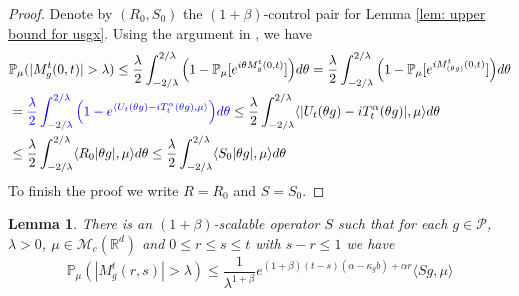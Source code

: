 \documentclass[12pt,oneside,english]{amsart}
\theoremstyle{plain}
\newtheorem{lem}[thm]{Lemma}
\theoremstyle{definition}
\numberwithin{equation}{section}
\newcommand{\added}[1]{{\color{blue}#1}}\newcommand{\deleted}[1]{{\color{red}#1}}
\begin{document}
\begin{proof}
    Denote by $(R_0,S_0)$ the $(1+\beta)$-control pair for Lemma \ref{lem: upper bound for usgx}.
    Using the argument in \cite[Proof of Theorem 3.3.6]{Durrett2010Probability}, we have
\begin{align}
    &\mathbb P_\mu (|M^t_g(0,t)| > \lambda)
    \leq \frac{\lambda}{2}\int_{-2/\lambda}^{2/\lambda}\Big(1 - \mathbb P_\mu[e^{i\theta M_g^t(0,t)}]\Big)d\theta
    = \frac{\lambda}{2}\int_{-2/\lambda}^{2/\lambda}\Big(1 - \mathbb P_\mu[e^{iM_{(\theta g)}^t(0,t)}]\Big)d\theta
    \\&= \added{\frac{\lambda}{2}\int_{-2/\lambda}^{2/\lambda}\Big(1-e^{\langle U_t(\theta g)-iT_t^{\alpha}(\theta g),\mu \rangle}\Big) d\theta}
    \leq \frac{\lambda}{2}\int_{-2/\lambda}^{2/\lambda}\langle |U_t(\theta g) - iT_t^\alpha(\theta g)|,\mu\rangle d\theta
    \\&\leq \frac{\lambda}{2}\int_{-2/\lambda}^{2/\lambda}\langle R_0|\theta g|,\mu\rangle d\theta
      \leq \frac{\lambda}{2}\int_{-2/\lambda}^{2/\lambda}\langle S_0|\theta g|,\mu\rangle d\theta
\end{align}
    To finish the proof we write $R=R_0$ and $S= S_0$.
\end{proof}

\begin{lem}
    There is an $(1+\beta)$-scalable operator $S$ such that for each $g\in \mathcal P$, $\lambda >0$, $\mu\in \mathcal M_c(\mathbb R^d)$ and $0\leq r\leq s\leq t$ with $s-r \leq 1$ we have
\[
    \mathbb P_{\mu}(|M^t_g(r,s)|>\lambda)
    \leq \frac{ 1}{\lambda^{1+\beta}} e^{(1+\beta)(t-s)(\alpha- \kappa_gb)+ \alpha r} \langle Sg,\mu\rangle
\]
\end{lem}
\end{document}
